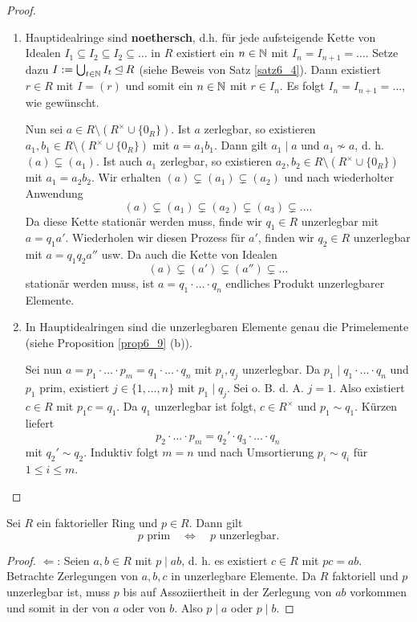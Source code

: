 \begin{proof}
	\begin{enumerate}
		\item Hauptidealringe sind \textbf{noethersch}, d.h. für jede aufsteigende Kette von Idealen $I_1 \subseteq I_2 \subseteq I_2 \subseteq \dots$ in $R$ existiert ein $n \in \mathbb{N}$ mit $I_n = I_{n+1} = \dots$. Setze dazu $I := \bigcup_{t \in \mathbb{N}} I_t \unlhd R$ (siehe Beweis von Satz \ref{satz6_4}). Dann existiert $r \in R$ mit $I = (r)$ und somit ein $n \in \mathbb{N}$ mit $r \in I_n$. Es folgt $I_n = I_{n+1} = \dots$, wie gewünscht. 
		
		Nun sei $a \in R \setminus (R^\times \cup \{0_R\})$. Ist $a$ zerlegbar, so existieren $a_1, b_1 \in R \setminus (R^\times \cup \{0_R\})$ mit $a = a_1 b_1$. Dann gilt $a_1 \mid a$ und $a_1 \not\sim a$, d. h. $(a) \subsetneq (a_1)$. Ist auch $a_1$ zerlegbar, so existieren $a_2, b_2 \in R \setminus (R^\times \cup \{0_R\})$ mit $a_1 = a_2 b_2$. Wir erhalten $(a) \subsetneq (a_1) \subsetneq (a_2)$ und nach wiederholter Anwendung
		\[(a) \subsetneq (a_1) \subsetneq (a_2) \subsetneq (a_3) \subsetneq \dots.\]
		Da diese Kette stationär werden muss, finde wir $q_1 \in R$ unzerlegbar mit $a = q_1 a'$. Wiederholen wir diesen Prozess für $a'$, finden wir $q_2 \in R$ unzerlegbar mit $a = q_1 q_2 a''$ usw. Da auch die Kette von Idealen
		\[(a) \subsetneq (a') \subsetneq (a'') \subsetneq \dots\]
		stationär werden muss, ist $a = q_1 \cdot \dots \cdot q_n$ endliches Produkt unzerlegbarer Elemente.
		\item In Hauptidealringen sind  die unzerlegbaren Elemente genau die Primelemente (siehe Proposition \ref{prop6_9} (b)). 
		
		Sei nun $a = p_1 \cdot \dots \cdot p_m = q_1 \cdot \dots \cdot q_n$ mit $p_i, q_j$ unzerlegbar. Da $p_1 \mid q_1 \cdot \dots \cdot q_n$ und $p_1$ prim, existiert $j \in \{1,\dots,n\}$ mit $p_1 \mid q_j$. Sei o. B. d. A. $j = 1$. Also existiert $c \in R$ mit $p_1 c   = q_1$. Da $q_1$ unzerlegbar ist folgt, $c \in R^\times$ und $p_1 \sim q_1$. Kürzen liefert
		\[p_2 \cdot \dots \cdot p_m = q_2' \cdot q_3 \cdot \dots \cdot q_n\]
		mit $q_2' \sim q_2$. Induktiv folgt $m = n$ und nach Umsortierung $p_i \sim q_i$ für $1 \leq i \leq m$.
	\end{enumerate}
\end{proof} 
\begin{rem}\label{rem6_14}
	Sei $R$ ein faktorieller Ring und $p \in R$. Dann gilt 
	\[p \text{ prim} \quad\Leftrightarrow\quad p \text{ unzerlegbar}.\]
	\begin{proof}
		\glqq{}$\Leftarrow$\grqq: Seien $a, b \in R$ mit $p \mid ab$, d. h. es existiert $c \in R$ mit $pc = ab$. Betrachte Zerlegungen von $a,b,c$ in unzerlegbare Elemente. Da $R$ faktoriell und $p$ unzerlegbar ist, muss $p$ bis auf Assoziiertheit in der Zerlegung von $ab$ vorkommen und somit in der von $a$ oder von $b$. Also $p \mid a$ oder $p \mid b$.
	\end{proof}
\end{rem}
